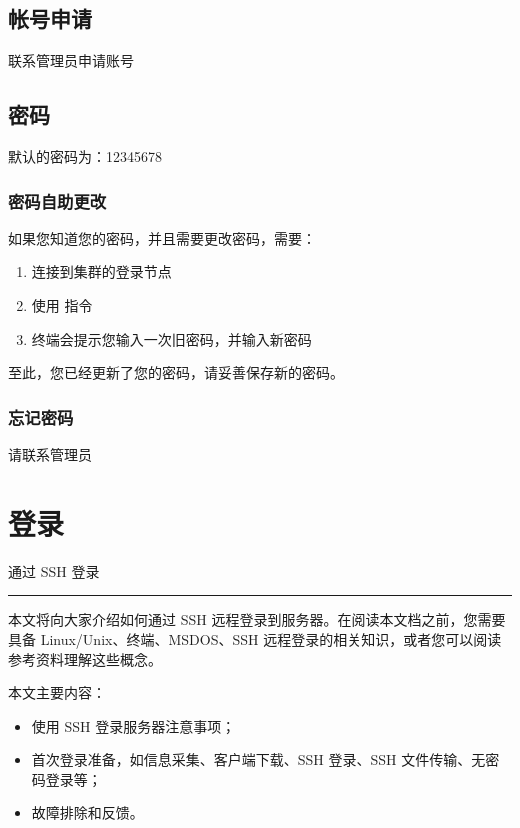 \documentclass[a4paper,12pt,english]{sphinxmanual}
\begin{document}
\section{帐号申请}
\label{\detokenize{accounts/index:id2}}
\sphinxAtStartPar
联系管理员申请账号


\section{密码}
\label{\detokenize{accounts/index:id3}}
\sphinxAtStartPar
默认的密码为：12345678


\subsection{密码自助更改}
\label{\detokenize{accounts/index:id4}}
\sphinxAtStartPar
如果您知道您的密码，并且需要更改密码，需要：
\begin{enumerate}
%
\item {} 
\sphinxAtStartPar
连接到集群的登录节点

\item {} 
\sphinxAtStartPar
使用 指令

\item {} 
\sphinxAtStartPar
终端会提示您输入一次旧密码，并输入新密码

\end{enumerate}

\sphinxAtStartPar
至此，您已经更新了您的密码，请妥善保存新的密码。


\subsection{忘记密码}
\label{\detokenize{accounts/index:id5}}
\sphinxAtStartPar
请联系管理员


\chapter{登录}
\label{\detokenize{login/index:id1}}\label{\detokenize{login/index::doc}}
\sphinxAtStartPar
通过 SSH 登录


\bigskip\hrule\bigskip


\sphinxAtStartPar
本文将向大家介绍如何通过 SSH 远程登录到服务器。在阅读本文档之前，您需要具备 Linux/Unix、终端、MS\sphinxhyphen{}DOS、SSH
远程登录的相关知识，或者您可以阅读参考资料理解这些概念。

\sphinxAtStartPar
本文主要内容：
\begin{itemize}
\item {} 
\sphinxAtStartPar
使用 SSH 登录服务器注意事项；

\item {} 
\sphinxAtStartPar
首次登录准备，如信息采集、客户端下载、SSH 登录、SSH 文件传输、无密码登录等；

\item {} 
\sphinxAtStartPar
故障排除和反馈。

\end{itemize}
\end{document}
